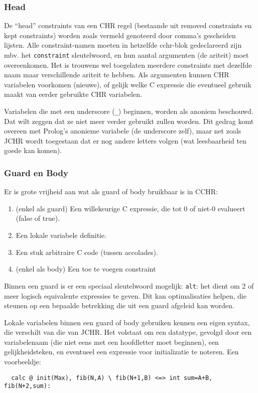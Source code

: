 \subsubsection{Head}

De ``head'' constraints van een CHR regel (bestaande uit removed constraints en kept constraints) worden zoals vermeld
genoteerd door comma's gescheiden lijsten. Alle constraint-namen moeten in hetzelfde cchr-blok gedeclareerd zijn mbv. het
{\tt constraint} sleutelwoord, en hun aantal argumenten (de ariteit) moet overeenkomen. Het is trouwens wel toegelaten
meerdere constraints met dezelfde naam maar verschillende ariteit te hebben. Als argumenten kunnen CHR variabelen voorkomen
(nieuwe), of gelijk welke C expressie die eventueel gebruik maakt van eerder gebruikte CHR variabelen. 

Variabelen die met een underscore ({\tt \_}) beginnen, worden als anoniem beschouwd. Dat wilt zeggen dat ze niet meer verder
gebruikt zullen worden. Dit gedrag komt overeen met Prolog's anonieme variabele (de underscore zelf), maar net zoals JCHR
wordt toegestaan dat er nog andere letters volgen (wat leesbaarheid ten goede kan komen).

\subsubsection{Guard en Body}

Er is grote vrijheid aan wat als guard of body bruikbaar is in CCHR: \begin{enumerate}
  \item (enkel als guard) Een willekeurige C expressie, die tot 0 of niet-0 evalueert (false of true).
  \item Een lokale variabele definitie.
  \item Een stuk arbitraire C code (tussen accolades).
  \item (enkel als body) Een toe te voegen constraint
\end{enumerate}

Binnen een guard is er een speciaal sleutelwoord mogelijk: {\tt alt}: het dient om 2 of meer logisch equivalente expressies
te geven. Dit kan optimalisaties helpen, die steunen op een bepaalde betrekking die uit een guard afgeleid kan worden.

Lokale variabelen binnen een guard of body gebruiken kennen een eigen syntax, die verschilt van die van JCHR. Het volstaat
om een datatype, gevolgd door een variabelenaam (die niet eens met een hoofdletter moet beginnen), een gelijkheidsteken, en
eventueel een expressie voor initializatie te noteren. Een voorbeeldje: \begin{Verbatim}
  calc @ init(Max), fib(N,A) \ fib(N+1,B) <=> int sum=A+B, fib(N+2,sum):
\end{Verbatim}

